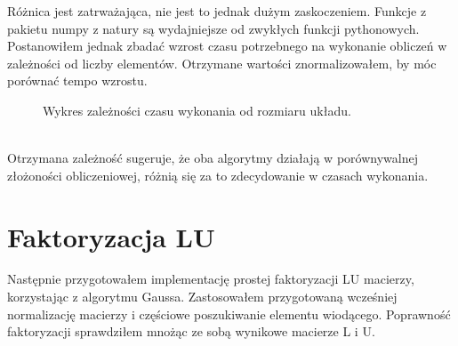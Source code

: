 \documentclass{article}
\begin{document}
        Różnica jest zatrważająca, nie jest to jednak dużym zaskoczeniem. Funkcje z pakietu numpy z natury są wydajniejsze od zwykłych funkcji pythonowych. Postanowiłem jednak zbadać wzrost czasu potrzebnego na wykonanie obliczeń w zależności od liczby elementów. Otrzymane wartości znormalizowałem, by móc porównać tempo wzrostu.\\
        \begin{figure}[h!]
            \centering
            \caption{Wykres zależności czasu wykonania od rozmiaru układu.}
        \end{figure}\\
        Otrzymana zależność sugeruje, że oba algorytmy działają w porównywalnej złożoności obliczeniowej, różnią się za to zdecydowanie w czasach wykonania.\\
        
    \section{Faktoryzacja LU}
        Następnie przygotowałem implementację prostej faktoryzacji LU macierzy, korzystając z algorytmu Gaussa. Zastosowałem przygotowaną wcześniej normalizację macierzy i częściowe poszukiwanie elementu wiodącego. Poprawność faktoryzacji sprawdziłem mnożąc ze sobą wynikowe macierze L i U. 
         
        
\end{document}
